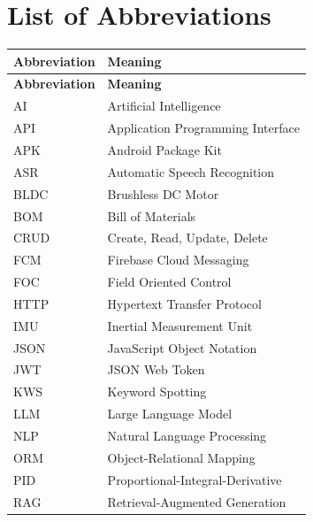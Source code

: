 \documentclass[12pt,a4paper]{report}
\begin{document}
\clearpage


\chapter*{List of Abbreviations}

\begin{center}
\begin{longtable}{@{}lp{}@{}}
\toprule
\textbf{Abbreviation} & \textbf{Meaning} \\
\midrule
\endfirsthead
\toprule
\textbf{Abbreviation} & \textbf{Meaning} \\
\midrule
\endhead
\bottomrule
\endfoot
AI      & Artificial Intelligence \\
API     & Application Programming Interface \\
APK     & Android Package Kit \\
ASR     & Automatic Speech Recognition \\
BLDC    & Brushless DC Motor \\
BOM     & Bill of Materials \\
CRUD    & Create, Read, Update, Delete \\
FCM     & Firebase Cloud Messaging \\
FOC     & Field Oriented Control \\
HTTP    & Hypertext Transfer Protocol \\
IMU     & Inertial Measurement Unit \\
JSON    & JavaScript Object Notation \\
JWT     & JSON Web Token \\
KWS     & Keyword Spotting \\
LLM     & Large Language Model \\
NLP     & Natural Language Processing \\
ORM     & Object-Relational Mapping \\
PID     & Proportional-Integral-Derivative \\
RAG     & Retrieval-Augmented Generation \\

\end{longtable}
\end{center}
\end{document}
